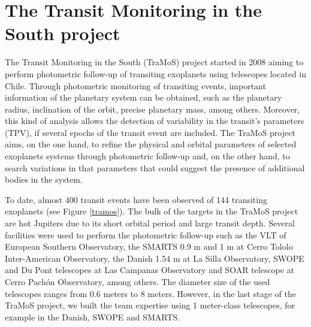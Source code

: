 \chapter{The Transit Monitoring in the South project}\label{chap:tramos}

The Transit Monitoring in the South (TraMoS) project started in 2008 aiming to perform photometric follow-up of transiting exoplanets using telescopes located in Chile.  Through photometric monitoring of transiting events, important information of the planetary system can be obtained, such as the planetary radius, inclination of the orbit, precise planetary mass, among others. Moreover, this kind of analysis allows the detection of variability in the transit's parameters (TPV), if several epochs of the transit event are included. The TraMoS project aims, on the one hand, to refine the physical and orbital parameters of selected exoplanets systems through photometric follow-up and, on the other hand, to search variations in that parameters that could suggest the presence of additional bodies in the system. 

To date, almost 400 transit events have been observed of 144 transiting exoplanets (see Figure \ref{tramos}). The bulk of the targets in the TraMoS project are hot Jupiters due to its short orbital period and large transit depth. Several facilities were used to perform the photometric follow-up such as the VLT of European Southern Observatory, the SMARTS 0.9 m and 1 m at Cerro Tololo Inter-American Observatory, the Danish 1.54 m at La Silla Observatory, SWOPE and Du Pont telescopes at Las Campanas Observatory and SOAR telescope at Cerro Pachón Observatory, among others. The diameter size of the used telescopes ranges from 0.6 meters to 8 meters. However, in the last stage of the TraMoS project, we built the team expertise using 1 meter-class telescopes, for example in the Danish, SWOPE and SMARTS.

